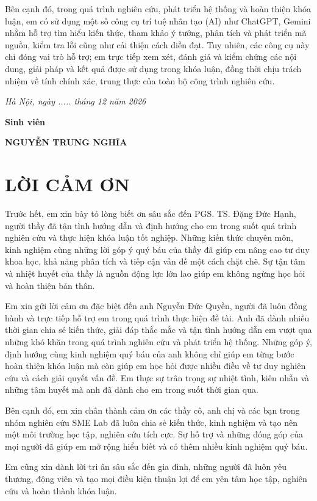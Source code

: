 \documentclass[12pt,a4paper,oneside]{extreport}
\newlength{\thesissignaturewidth}
\newcommand*{\thesissignature}{%
  \par\begingroup
  \settowidth{\thesissignaturewidth}{\emph{Hà Nội, ngày ..... tháng 12 năm 2026}}%
  \begin{minipage}[t]{\thesissignaturewidth}
    \centering
    \setlength{\parskip}{6pt}%
    \emph{Hà Nội, ngày ..... tháng 12 năm 2026}\par
    \textbf{Sinh viên}\par
    \vspace{2\baselineskip}
    \textbf{NGUYỄN TRUNG NGHĨA}\par
  \end{minipage}%
  \par\endgroup
}
\begin{document}
Bên cạnh đó, trong quá trình nghiên cứu, phát triển hệ thống và hoàn thiện khóa luận, em có sử dụng một số công cụ trí tuệ nhân tạo (AI) như ChatGPT, Gemini nhằm hỗ trợ tìm hiểu kiến thức, tham khảo ý tưởng, phân tích và phát triển mã nguồn, kiểm tra lỗi cũng như cải thiện cách diễn đạt. Tuy nhiên, các công cụ này chỉ đóng vai trò hỗ trợ; em trực tiếp xem xét, đánh giá và kiểm chứng các nội dung, giải pháp và kết quả được sử dụng trong khóa luận, đồng thời chịu trách nhiệm về tính chính xác, trung thực của toàn bộ công trình nghiên cứu.

\thesissignature

\chapter*{LỜI CẢM ƠN}

Trước hết, em xin bày tỏ lòng biết ơn sâu sắc đến PGS. TS. Đặng Đức Hạnh, người thầy đã tận tình hướng dẫn và định hướng cho em trong suốt quá trình nghiên cứu và thực hiện khóa luận tốt nghiệp. Những kiến thức chuyên môn, kinh nghiệm cùng những lời góp ý quý báu của thầy đã giúp em nâng cao tư duy khoa học, khả năng phân tích và tiếp cận vấn đề một cách chặt chẽ. Sự tận tâm và nhiệt huyết của thầy là nguồn động lực lớn lao giúp em không ngừng học hỏi và hoàn thiện bản thân.

Em xin gửi lời cảm ơn đặc biệt đến anh Nguyễn Đức Quyền, người đã luôn đồng hành và trực tiếp hỗ trợ em trong quá trình thực hiện đề tài. Anh đã dành nhiều thời gian chia sẻ kiến thức, giải đáp thắc mắc và tận tình hướng dẫn em vượt qua những khó khăn trong quá trình nghiên cứu và phát triển hệ thống. Những góp ý, định hướng cùng kinh nghiệm quý báu của anh không chỉ giúp em từng bước hoàn thiện khóa luận mà còn giúp em học hỏi được nhiều điều về tư duy nghiên cứu và cách giải quyết vấn đề. Em thực sự trân trọng sự nhiệt tình, kiên nhẫn và những tâm huyết mà anh đã dành cho em trong suốt thời gian qua.

Bên cạnh đó, em xin chân thành cảm ơn các thầy cô, anh chị và các bạn trong nhóm nghiên cứu SME Lab đã luôn chia sẻ kiến thức, kinh nghiệm và tạo nên một môi trường học tập, nghiên cứu tích cực. Sự hỗ trợ và những đóng góp của mọi người đã giúp em mở rộng hiểu biết và có thêm nhiều kinh nghiệm quý báu.

Em cũng xin dành lời tri ân sâu sắc đến gia đình, những người đã luôn yêu thương, động viên và tạo mọi điều kiện thuận lợi để em yên tâm học tập, nghiên cứu và hoàn thành khóa luận.
\end{document}
